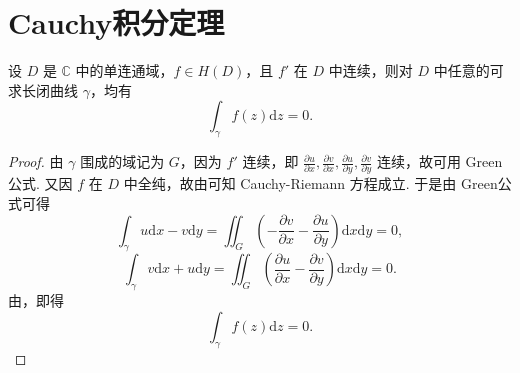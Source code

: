 \documentclass[../../main.tex]{subfiles}
\begin{document}
\section{Cauchy积分定理}

\begin{theorem}[Cauchy定理]\label{theorem:Cauchy定理}
设 \( D \) 是 \( \mathbb{C} \) 中的单连通域，\( f \in H(D) \)，且 \( f' \) 在 \( D \) 中连续，则对 \( D \) 中任意的可求长闭曲线 \( \gamma \)，均有
\[
\int_\gamma f(z)\mathrm{d}z = 0.
\]
\end{theorem}
\begin{proof}  
由 \( \gamma \) 围成的域记为 \( G \)，因为 \( f' \) 连续，即 \( \frac{\partial u}{\partial x}, \frac{\partial v}{\partial x}, \frac{\partial u}{\partial y}, \frac{\partial v}{\partial y} \) 连续，故可用 Green 公式. 又因 \( f \) 在 \( D \) 中全纯，故由可知 Cauchy-Riemann 方程成立. 于是由 Green公式可得
\[
\int_\gamma u \mathrm{d}x - v \mathrm{d}y = \iint_G \left( -\frac{\partial v}{\partial x} - \frac{\partial u}{\partial y} \right) \mathrm{d}x\mathrm{d}y = 0,
\]
\[
\int_\gamma v \mathrm{d}x + u \mathrm{d}y = \iint_G \left( \frac{\partial u}{\partial x} - \frac{\partial v}{\partial y} \right) \mathrm{d}x\mathrm{d}y = 0.
\]
由，即得
\[
\int_\gamma f(z)\mathrm{d}z = 0.
\]
\end{proof}
\end{document}
